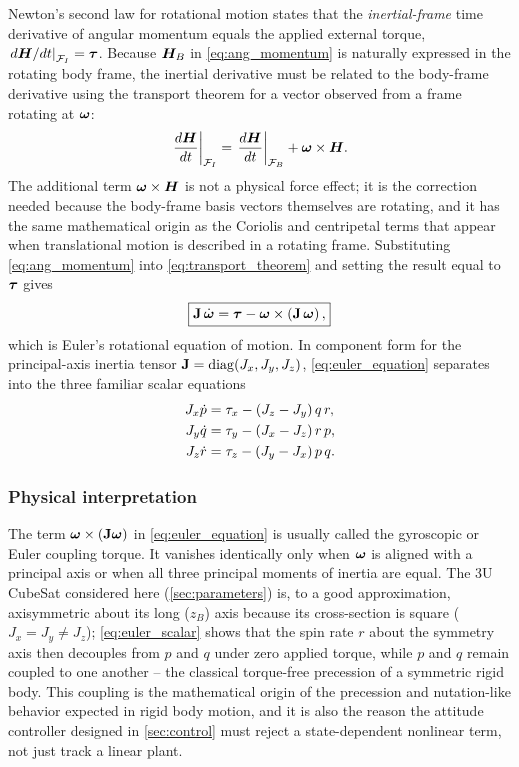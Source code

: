 Newton's second law for rotational motion states that the \emph{inertial-frame} time derivative of angular momentum equals the applied external torque, $\left.d\bm{H}/dt\right|_{\mathcal{F}_I} = \bm{\tau}$. Because $\bm{H}_B$ in \cref{eq:ang_momentum} is naturally expressed in the rotating body frame, the inertial derivative must be related to the body-frame derivative using the transport theorem for a vector observed from a frame rotating at $\bm{\omega}$:
\begin{equation}
    \left.\frac{d\bm{H}}{dt}\right|_{\mathcal{F}_I} = \left.\frac{d\bm{H}}{dt}\right|_{\mathcal{F}_B} + \bm{\omega}\times\bm{H}.
    \label{eq:transport_theorem}
\end{equation}
The additional term $\bm{\omega}\times\bm{H}$ is not a physical force effect; it is the correction needed because the body-frame basis vectors themselves are rotating, and it has the same mathematical origin as the Coriolis and centripetal terms that appear when translational motion is described in a rotating frame. Substituting \cref{eq:ang_momentum} into \cref{eq:transport_theorem} and setting the result equal to $\bm{\tau}$ gives
\begin{equation}
    \boxed{\mathbf{J}\,\dot{\bm{\omega}} = \bm{\tau} - \bm{\omega}\times\left(\mathbf{J}\,\bm{\omega}\right),}
    \label{eq:euler_equation}
\end{equation}
which is Euler's rotational equation of motion. In component form for the principal-axis inertia tensor $\mathbf{J}=\operatorname{diag}(J_x,J_y,J_z)$, \cref{eq:euler_equation} separates into the three familiar scalar equations
\begin{align}
    J_x\dot{p} &= \tau_x - (J_z-J_y)\,q\,r, \notag\\
    J_y\dot{q} &= \tau_y - (J_x-J_z)\,r\,p, \label{eq:euler_scalar}\\
    J_z\dot{r} &= \tau_z - (J_y-J_x)\,p\,q. \notag
\end{align}

\subsubsection{Physical interpretation}

The term $\bm{\omega}\times(\mathbf{J}\bm{\omega})$ in \cref{eq:euler_equation} is usually called the gyroscopic or Euler coupling torque. It vanishes identically only when $\bm{\omega}$ is aligned with a principal axis or when all three principal moments of inertia are equal. The 3U CubeSat considered here (\cref{sec:parameters}) is, to a good approximation, axisymmetric about its long ($z_B$) axis because its cross-section is square ($J_x = J_y \neq J_z$); \cref{eq:euler_scalar} shows that the spin rate $r$ about the symmetry axis then decouples from $p$ and $q$ under zero applied torque, while $p$ and $q$ remain coupled to one another -- the classical torque-free precession of a symmetric rigid body. This coupling is the mathematical origin of the precession and nutation-like behavior expected in rigid body motion, and it is also the reason the attitude controller designed in \cref{sec:control} must reject a state-dependent nonlinear term, not just track a linear plant.

